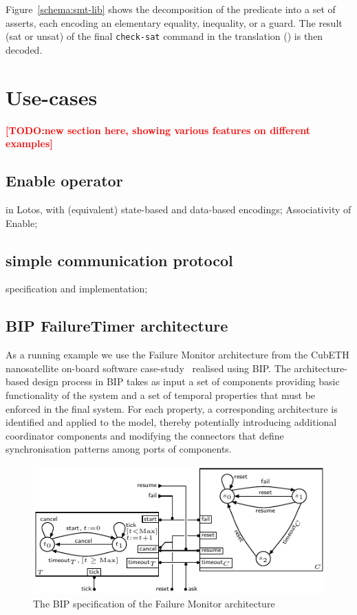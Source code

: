 \documentclass[smallcondensed]{svjour3}
\newcommand{\TODO}[1]{\textcolor{red}{\textbf{[TODO:#1]}}}
\begin{document}
Figure~\ref{schema:smt-lib} shows the decomposition of the
predicate into a set of asserts, each encoding an elementary equality,
inequality, or a guard. 
The result (sat or unsat) of the final \texttt{check-sat} command in
the translation () is then decoded.

\section{Use-cases}
\TODO{new section here, showing various features on different examples}

\subsection{Enable operator} in Lotos, with (equivalent) state-based and data-based encodings; Associativity of Enable;

\subsection{simple communication protocol} specification and implementation;

\subsection{BIP FailureTimer architecture}


\label{section:FailureTimerMax}
\label{section:BIParchitectures}
\label{section:examples}

As a running example we use the Failure Monitor architecture from the
CubETH nanosatellite on-board software
case-study~\cite{CubETH-case-study} realised using BIP.
The architecture-based design process in BIP takes as input a set of
components providing basic functionality of the system and a set of
temporal properties that must be enforced in the final system.  For
each property, a corresponding architecture is identified
and applied to the model, thereby potentially introducing additional
coordinator components and modifying the connectors that define
synchronisation patterns among ports of components.

\begin{figure}[t]
  \centering
  \includegraphics[width=\columnwidth]{ActaXFIG/BIPspec-ArchFailureTimer-v2-2}
  \caption{The BIP specification of the Failure Monitor architecture}
  \label{schema:ArchFailure:BIP}
\end{figure}
\end{document}
